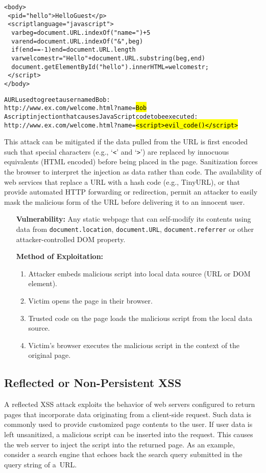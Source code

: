 \documentclass{acmtrans2m}
\begin{document}
\begin{alltt}
{
<body>
\	<p id="hello">Hello Guest</p>
\	<script language="javascript">
\	\	var beg = document.URL.indexOf("name=")+5
\	\	var end = document.URL.indexOf("\&", beg)
\	\	if (end==-1) end = document.URL.length
\	\	var welcomestr = "Hello " + document.URL.substring(beg, end)
\	\	document.getElementById("hello").innerHTML = welcomestr;
\	</script>
</body>

\textnormal{A URL used to greet a user named Bob:}
http://www.ex.com/welcome.html?name=\hl{Bob}
\textnormal{A script injection that causes JavaScript code to be executed:}
http://www.ex.com/welcome.html?name=\hl{<script>evil_code()</script>}
}
\end{alltt}

This attack can be mitigated if the data pulled from the URL is first encoded such that special characters (e.g., `\texttt{<}' and `\texttt{>}') are replaced by innocuous equivalents (HTML encoded) before being placed in the page.
Sanitization forces the browser to interpret the injection as data rather than code.
The availability of web services that replace a URL with a hash code (e.g., TinyURL), or that provide automated HTTP forwarding or redirection, permit an attacker to easily mask the malicious form of the URL before delivering it to an innocent user.

\begin{itemize}
 \item[\textbf{Vulnerability:}] Any static webpage that can self-modify its contents using data from \texttt{document.location}, \texttt{document.URL}, \texttt{document.referrer} or other attacker-controlled DOM property.
 \item[\textbf{Method of Exploitation:}]~
  \begin{enumerate}
   \item Attacker embeds malicious script into local data source (URL or DOM element).
   \item Victim opens the page in their browser.
   \item Trusted code on the page loads the malicious script from the local data source.
   \item Victim's browser executes the malicious script in the context of the original page.
  \end{enumerate}
\end{itemize}

\subsection{Reflected or Non-Persistent XSS}\label{sec:xss-types-reflected}
A reflected XSS attack exploits the behavior of web servers configured to return pages that incorporate data originating from a client-side request.
Such data is commonly used to provide customized page contents to the user.
If user data is left unsanitized, a malicious script can be inserted into the request.
This causes the web server to inject the script into the returned page.
As an example, consider a search engine that echoes back the search query submitted in the query string of a~URL.
\end{document}
